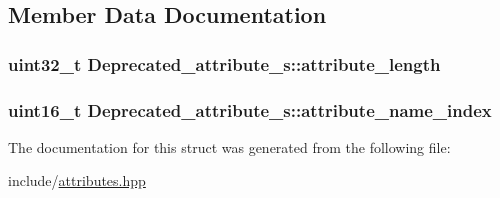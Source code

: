 \subsection{Member Data Documentation}
\hypertarget{structDeprecated__attribute__s_a5c1b473858ed1435598d5ce11ae8a0c3}{
\subsubsection[{attribute\+\_\+length}]{\setlength{\rightskip}{0pt plus 5cm}uint32\+\_\+t Deprecated\+\_\+attribute\+\_\+s\+::attribute\+\_\+length}}\label{structDeprecated__attribute__s_a5c1b473858ed1435598d5ce11ae8a0c3}
\hypertarget{structDeprecated__attribute__s_ad8fd16bc95d09719922224c303248ca9}{
\subsubsection[{attribute\+\_\+name\+\_\+index}]{\setlength{\rightskip}{0pt plus 5cm}uint16\+\_\+t Deprecated\+\_\+attribute\+\_\+s\+::attribute\+\_\+name\+\_\+index}}\label{structDeprecated__attribute__s_ad8fd16bc95d09719922224c303248ca9}


The documentation for this struct was generated from the following file\+:\begin{DoxyCompactItemize}
\item 
include/\hyperlink{attributes_8hpp}{attributes.\+hpp}\end{DoxyCompactItemize}
